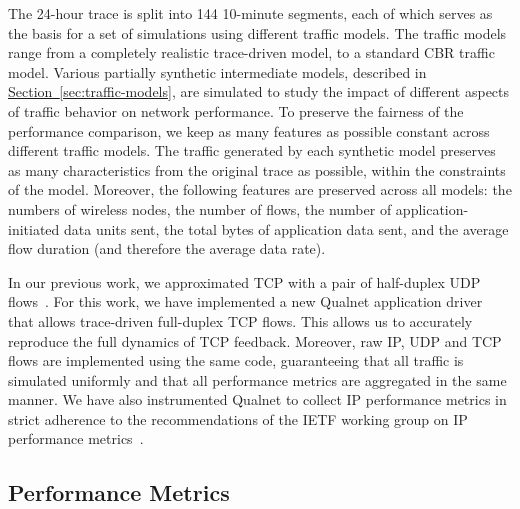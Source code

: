 \documentclass[twocolumn,final]{svjour3}
\newcommand{\caps}[1]{{\small{#1}}}
\newcommand{\Section}[1]{\hyperref[sec:#1]{Section~\ref*{sec:#1}}}
\begin{document}
The 24-hour trace is split into 144 10-minute segments, each of which serves as the basis for a set of simulations using different traffic models. The traffic models range from a completely realistic trace-driven model, to a standard \caps{CBR} traffic model. Various partially synthetic intermediate models, described in \Section{traffic-models}, are simulated to study the impact of different aspects of traffic behavior on network performance. To preserve the fairness of the performance comparison, we keep as many features as possible constant across different traffic models. The traffic generated by each synthetic model preserves as many characteristics from the original trace as possible, within the constraints of the model. Moreover, the following features are preserved across all models: the numbers of wireless nodes, the number of flows, the number of application-initiated data units sent, the total bytes of application data sent, and the average flow duration (and therefore the average data rate).

In our previous work, we approximated \caps{TCP} with a pair of half-duplex \caps{UDP} flows~\cite{Karpinski07:realism,Karpinski07:cbr-failure}. For this work, we have implemented a new Qualnet application driver that allows trace-driven full-duplex \caps{TCP} flows. This allows us to accurately reproduce the full dynamics of \caps{TCP} feedback. Moreover, raw \caps{IP}, \caps{UDP} and \caps{TCP} flows are implemented using the same code, guaranteeing that all traffic is simulated uniformly and that all performance metrics are aggregated in the same manner. We have also instrumented Qualnet to collect \caps{IP} performance metrics in strict adherence to the recommendations of the \caps{IETF} working group on \caps{IP} performance metrics~\cite{rfc:ip-metrics}.

\subsection{Performance Metrics}
\label{sec:performance-metrics}
\end{document}
